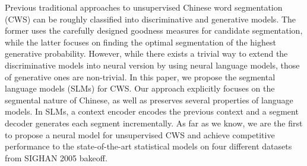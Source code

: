 Previous traditional approaches to unsupervised Chinese word segmentation (CWS) can be roughly classified into discriminative and generative models. The former uses the carefully designed goodness measures for candidate segmentation, while the latter focuses on finding the optimal segmentation of the highest generative probability. However, while there exists a trivial way to extend the discriminative models into neural version by using neural language models, those of generative ones are non-trivial. In this paper, we propose the segmental language models (SLMs) for CWS. Our approach explicitly focuses on the segmental nature of Chinese, as well as preserves several properties of language models. In SLMs, a context encoder encodes the previous context and a segment decoder generates each segment incrementally. As far as we know, we are the first to propose a neural model for unsupervised CWS and achieve competitive performance to the state-of-the-art statistical models on four different datasets from SIGHAN 2005 bakeoff.
